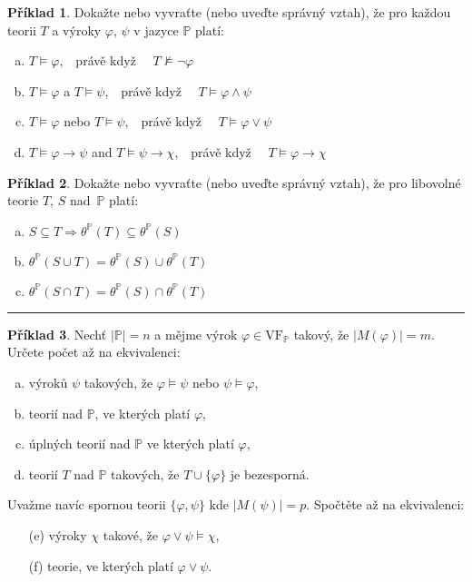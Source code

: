 \documentclass{amsart}
\theoremstyle{definition}
\newtheorem{problem}{Příklad}
\begin{document}
\begin{problem}
Dokažte nebo vyvraťte (nebo uveďte správný vztah), že pro každou teorii $T$ a výroky $\varphi$, $\psi$ v jazyce $\mathbb{P}$ platí:
\begin{enumerate}[(a)]
\item $T \models \varphi$,\ \  právě když \ \ $T \not\models \neg \varphi$
\item $T \models \varphi$ a $T \models \psi$,\ \ právě když \ \ $T \models \varphi \wedge \psi$
\item $T \models \varphi$ nebo $T \models \psi$,\ \ právě když \ \ $T \models \varphi \vee \psi$
\item $T \models \varphi \to \psi$ and $T \models \psi \to \chi$,\ \ právě když \ \ $T \models \varphi \to \chi$
\end{enumerate}
\end{problem}

\begin{problem}
Dokažte nebo vyvraťte (nebo uveďte správný vztah), že pro libovolné teorie $T$, $S$ nad~$\mathbb{P}$ platí:
\begin{enumerate}[(a)]
\item $S\subseteq T \Rightarrow \theta^{\mathbb{P}}(T) \subseteq \theta^{\mathbb{P}}(S)$
\item $\theta^{\mathbb{P}}(S\cup T)=\theta^{\mathbb{P}}(S) \cup \theta^{\mathbb{P}}(T)$
\item $\theta^{\mathbb{P}}(S\cap T)=\theta^{\mathbb{P}}(S) \cap \theta^{\mathbb{P}}(T)$
\end{enumerate}
\end{problem}

\hrule

\begin{problem}
Nechť $|\mathbb{P}|=n$ a mějme výrok $\varphi\in\mathrm{VF}_{\mathbb{P}}$ takový, že $|M(\varphi)|=m$. Určete počet až na ekvivalenci:
\begin{enumerate}[(a)]
\item výroků $\psi$ takových, že $\varphi \models \psi$ nebo $\psi \models \varphi$,
\item teorií nad $\mathbb{P}$, ve kterých platí $\varphi$,
\item úplných teorií nad $\mathbb{P}$ ve kterých platí $\varphi$,
\item teorií $T$ nad $\mathbb{P}$ takových, že $T \cup \{\varphi\}$ je bezesporná.
\end{enumerate}
Uvažme navíc spornou teorii $\{\varphi,\psi\}$ kde $|M(\psi)|=p$. Spočtěte až na ekvivalenci:
\begin{enumerate}[(a)]
\item[(e)] výroky $\chi$ takové, že $\varphi \vee \psi \models \chi$, 
\item[(f)] teorie, ve kterých platí $\varphi \vee \psi$.
\end{enumerate}
\end{problem}
\end{document}
